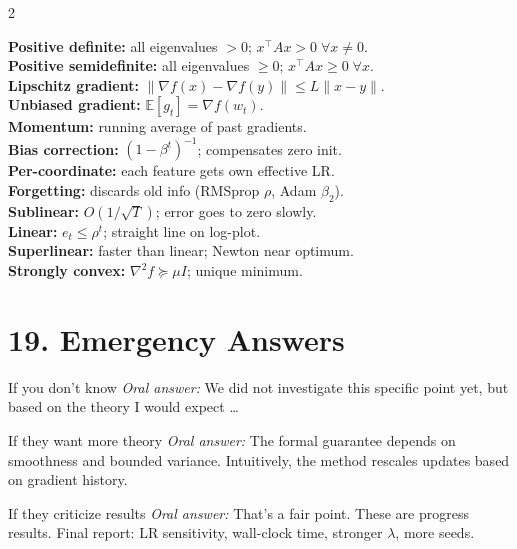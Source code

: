 \documentclass[a4paper,9pt]{article}
\newcommand{\oral}{\textit{\color{darkgray}Oral answer: }}
\begin{document}
\begin{multicols}{2}
\begin{tcolorbox}[title=\textbf{Fast Definitions}, colback=white]
\textbf{Positive definite:} all eigenvalues \(>0\); \(x^\top\!Ax > 0\;\forall x\neq 0\).\\
\textbf{Positive semidefinite:} all eigenvalues \(\geq 0\); \(x^\top\!Ax \geq 0\;\forall x\).\\
\textbf{Lipschitz gradient:} \(\|\nabla f(x)-\nabla f(y)\| \leq L\|x-y\|\).\\
\textbf{Unbiased gradient:} \(\mathbb{E}[g_t] = \nabla f(w_t)\).\\
\textbf{Momentum:} running average of past gradients.\\
\textbf{Bias correction:} \((1-\beta^t)^{-1}\); compensates zero init.\\
\textbf{Per-coordinate:} each feature gets own effective LR.\\
\textbf{Forgetting:} discards old info (RMSprop \(\rho\), Adam \(\beta_2\)).\\
\textbf{Sublinear:} \(O(1/\sqrt{T})\); error goes to zero slowly.\\
\textbf{Linear:} \(e_t \leq \rho^t\); straight line on log-plot.\\
\textbf{Superlinear:} faster than linear; Newton near optimum.\\
\textbf{Strongly convex:} \(\nabla^2 f \succeq \mu I\); unique minimum.
\end{tcolorbox}

\section{19. Emergency Answers}

\begin{qa}{If you don't know}
\oral We did not investigate this specific point yet, but based on the theory I would expect \dots
\end{qa}

\begin{qa}{If they want more theory}
\oral The formal guarantee depends on smoothness and bounded variance. Intuitively, the method rescales updates based on gradient history.
\end{qa}

\begin{qa}{If they criticize results}
\oral That's a fair point. These are progress results. Final report: LR sensitivity, wall-clock time, stronger \(\lambda\), more seeds.
\end{qa}


\end{multicols}
\end{document}
